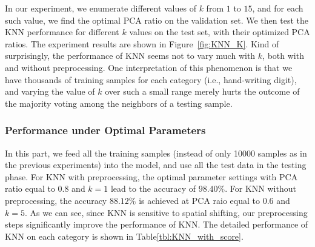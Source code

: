 \documentclass{article}
\begin{document}
In our experiment, we enumerate different values of $k$ from $1$ to $15$, and for each such value, we find the optimal PCA ratio on the validation set. We then test the KNN performance for different $k$ values on the test set, with their optimized PCA ratios. The experiment results are shown in Figure~\ref{fig:KNN_K}. Kind of surprisingly, the performance of KNN seems not to vary much with $k$, both with and without preprocessing. One interpretation of this phenomenon is that we have thousands of training samples for each category (i.e., hand-writing digit), and varying the value of $k$ over such a small range merely hurts the outcome of the majority voting among the neighbors of a testing sample. 


\subsubsection{Performance under Optimal Parameters}
In this part, we feed all the training samples (instead of only 10000 samples as in the previous experiments) into the model, and use all the test data in the testing phase. For KNN with preprocessing, the optimal parameter settings with PCA ratio equal to $0.8$ and $k=1$ lead to the accuracy of $98.40\%$. For KNN without preprocessing, the accuracy $88.12\%$ is achieved at PCA raio equal to $0.6$ and $k=5$. As we can see, since KNN is sensitive to spatial shifting, our preprocessing steps significantly improve the performance of KNN. The detailed performance of KNN on each category is shown in Table\ref{tbl:KNN_with_score}.
\end{document}
